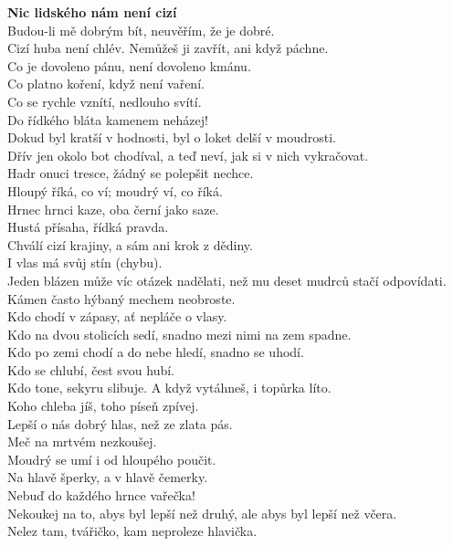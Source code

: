 \begin{multicols}{\value{columnsgames}}
\noindent
{\large\bf Nic lidského nám není cizí}\\[1 mm]
Budou-li mě dobrým bít, neuvěřím, že je dobré.\\
Cizí huba není chlév. Nemůžeš ji zavřít, ani když páchne.\\
Co je dovoleno pánu, není dovoleno kmánu.\\
Co platno koření, když není vaření.\\
Co se rychle vznítí, nedlouho svítí.\\
Do řídkého bláta kamenem neházej!\\
Dokud byl kratší v hodnosti, byl o loket delší v moudrosti.\\
Dřív jen okolo bot chodíval, a teď neví, jak si v nich vykračovat.\\
Hadr onuci tresce, žádný se polepšit nechce.\\
Hloupý říká, co ví; moudrý ví, co říká.\\
Hrnec hrnci kaze, oba černí jako saze.\\
Hustá přísaha, řídká pravda.\\
Chválí cizí krajiny, a sám ani krok z dědiny.\\
I vlas má svůj stín (chybu).\\
Jeden blázen může víc otázek nadělati, než mu deset mudrců stačí 
odpovídati.\\
Kámen často hýbaný mechem neobroste.\\
Kdo chodí v zápasy, ať nepláče o vlasy.\\
Kdo na dvou stolicích sedí, snadno mezi nimi na zem spadne.\\
Kdo po zemi chodí a do nebe hledí, snadno se uhodí.\\
Kdo se chlubí, čest svou hubí.\\
Kdo tone, sekyru slibuje. A když vytáhneš, i topůrka líto.\\
Koho chleba jíš, toho píseň zpívej.\\
Lepší o nás dobrý hlas, než ze zlata pás.\\
Meč na mrtvém nezkoušej.\\
Moudrý se umí i od hloupého poučit.\\
Na hlavě šperky, a v hlavě čemerky.\\
Nebuď do každého hrnce vařečka!\\
Nekoukej na to, abys byl lepší než druhý, ale abys byl lepší 
než včera.\\
Nelez tam, tvářičko, kam neproleze hlavička.\\

\end{multicols}
